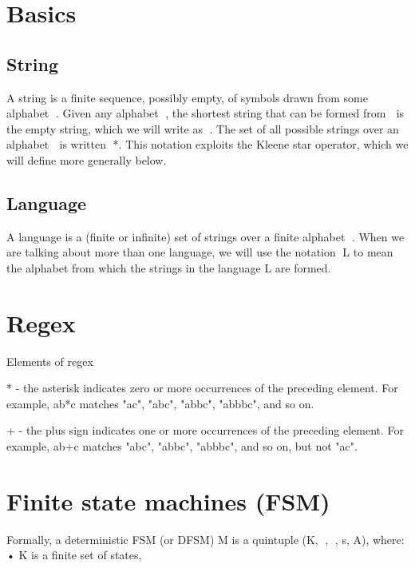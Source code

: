 \documentclass{article}
\begin{document}
% 
% 



\section{Basics}

\subsection{String}

A string is a finite sequence, possibly empty, of symbols drawn from some
alphabet . Given any alphabet , the shortest string that can be formed from 
is the empty string, which we will write as . The set of all possible strings
over an alphabet  is written *. This notation exploits the Kleene star
operator, which we will define more generally below.

\subsection{Language}

A language is a (finite or infinite) set of strings over a finite alphabet .
When we are talking about more than one language, we will use the notation L
to mean the alphabet from which the strings in the language L are formed.

\section{Regex}

Elements of regex

* - the asterisk indicates zero or more occurrences of the preceding element.
For example, ab*c matches "ac", "abc", "abbc", "abbbc", and so on. 

+ - the plus sign indicates one or more occurrences of the preceding element.
For example, ab+c matches "abc", "abbc", "abbbc", and so on, but not "ac". 

\section{Finite state machines (FSM)}

Formally, a deterministic FSM (or DFSM) M is a quintuple (K, , , s, A),
where: • K is a finite set of states,
\end{document}
